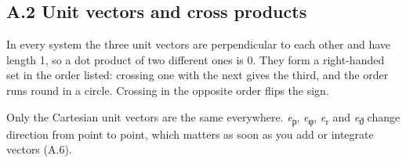 \documentclass[11pt]{article}
\begin{document}
\begin{keepsection}
\section{A.2 Unit vectors and cross products}

In every system the three unit vectors are perpendicular to each other and have length 1, so a dot product of two different ones is 0. They form a right-handed set in the order listed: crossing one with the next gives the third, and the order runs round in a circle. Crossing in the opposite order flips the sign.

Only the Cartesian unit vectors are the same everywhere. \textit{e}\textsubscript{ρ}, \textit{e}\textsubscript{φ}, \textit{e}\textsubscript{r} and \textit{e}\textsubscript{ϑ} change direction from point to point, which matters as soon as you add or integrate vectors (A.6).


\end{keepsection}
\end{document}
